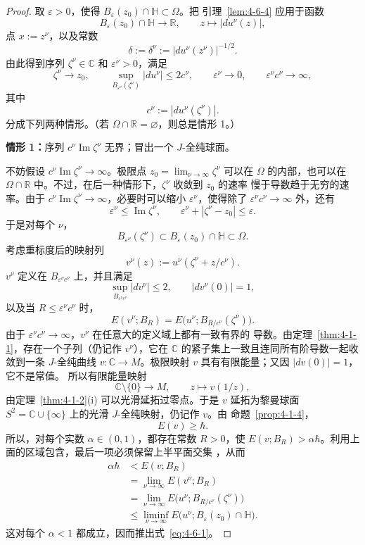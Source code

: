 \begin{proof}
取 $\varepsilon>0$，使得 $B_\varepsilon(z_0)\cap\mathbb H\subset\Omega$。把
引理~\ref{lem:4-6-4} 应用于函数
\[
  B_\varepsilon(z_0)\cap\mathbb H\longrightarrow\mathbb R,
  \qquad z\longmapsto|du^\nu(z)|,
\]
点 $x:=z^\nu$，以及常数
\[
  \delta:=\delta^\nu:=|du^\nu(z^\nu)|^{-1/2}.
\]
由此得到序列 $\zeta^\nu\in\mathbb C$ 和 $\varepsilon^\nu>0$，满足
\[
  \zeta^\nu\to z_0,
  \qquad
  \sup_{B_{\varepsilon^\nu}(\zeta^\nu)}|du^\nu|\le2c^\nu,
  \qquad
  \varepsilon^\nu\to0,
  \qquad
  \varepsilon^\nu c^\nu\to\infty,
\]
其中
\[
  c^\nu:=|du^\nu(\zeta^\nu)|.
\]
分成下列两种情形。（若 $\Omega\cap\mathbb R=\varnothing$，则总是情形 1。）

\medskip
\noindent\textbf{情形 1：}序列 $c^\nu\operatorname{Im}\zeta^\nu$ 无界；冒出一个
$J$-全纯球面。

不妨假设 $c^\nu\operatorname{Im}\zeta^\nu\to\infty$。极限点
$z_0=\lim_{\nu\to\infty}\zeta^\nu$ 可以在 $\Omega$ 的内部，也可以在
$\Omega\cap\mathbb R$ 中。不过，在后一种情形下，$\zeta^\nu$ 收敛到 $z_0$ 的速率
慢于导数趋于无穷的速率。由于
$c^\nu\operatorname{Im}\zeta^\nu\to\infty$，必要时可以缩小
$\varepsilon^\nu$，使得除了 $\varepsilon^\nu c^\nu\to\infty$ 外，还有
\[
  \varepsilon^\nu\le\operatorname{Im}\zeta^\nu,
  \qquad
  \varepsilon^\nu+|\zeta^\nu-z_0|\le\varepsilon.
\]
于是对每个 $\nu$，
\[
  B_{\varepsilon^\nu}(\zeta^\nu)
  \subset B_\varepsilon(z_0)\cap\mathbb H
  \subset\Omega.
\]
考虑重标度后的映射列
\[
  v^\nu(z):=u^\nu(\zeta^\nu+z/c^\nu).
\]
$v^\nu$ 定义在 $B_{\varepsilon^\nu c^\nu}$ 上，并且满足
\[
  \sup_{B_{\varepsilon^\nu c^\nu}}|dv^\nu|\le2,
  \qquad |dv^\nu(0)|=1,
\]
以及当 $R\le\varepsilon^\nu c^\nu$ 时，
\[
  E(v^\nu;B_R)
  =E\bigl(u^\nu;B_{R/c^\nu}(\zeta^\nu)\bigr).
\]
由于 $\varepsilon^\nu c^\nu\to\infty$，$v^\nu$ 在任意大的定义域上都有一致有界的
导数。由定理~\ref{thm:4-1-1}，存在一个子列（仍记作 $v^\nu$），它在
$\mathbb C$ 的紧子集上一致且连同所有阶导数一起收敛到一条 $J$-全纯曲线
$v:\mathbb C\to M$。极限映射 $v$ 具有有限能量；又因 $|dv(0)|=1$，它不是常值。
所以有限能量映射
\[
  \mathbb C\setminus\{0\}\longrightarrow M,
  \qquad z\longmapsto v(1/z),
\]
由定理~\ref{thm:4-1-2}(i) 可以光滑延拓过零点。于是 $v$ 延拓为黎曼球面
$S^2=\mathbb C\cup\{\infty\}$ 上的光滑 $J$-全纯映射，仍记作 $v$。由
命题~\ref{prop:4-1-4}，
\[
  E(v)\ge\hbar.
\]
所以，对每个实数 $\alpha\in(0,1)$，都存在常数 $R>0$，使
$E(v;B_R)>\alpha\hbar$。利用上面的区域包含，最后一项必须保留上半平面交集
，从而
\[
  \begin{aligned}
  \alpha\hbar
  &<E(v;B_R)\\
  &=\lim_{\nu\to\infty}E(v^\nu;B_R)\\
  &=\lim_{\nu\to\infty}
    E\bigl(u^\nu;B_{R/c^\nu}(\zeta^\nu)\bigr)\\
  &\le\liminf_{\nu\to\infty}
    E\bigl(u^\nu;B_\varepsilon(z_0)\cap\mathbb H\bigr).
  \end{aligned}
\]
这对每个 $\alpha<1$ 都成立，因而推出式~\eqref{eq:4-6-1}。


\end{proof}
